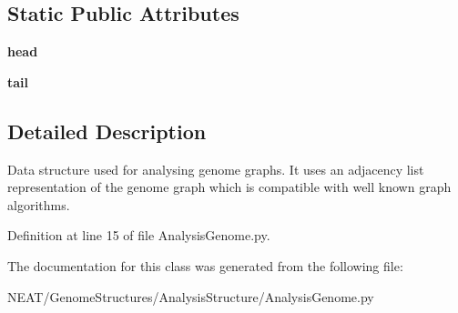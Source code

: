 \subsection*{Static Public Attributes}
\begin{DoxyCompactItemize}
\item 
{\bfseries head}\hypertarget{class_n_e_a_t___py_genetics_1_1_n_e_a_t_1_1_genome_structures_1_1_analysis_structure_1_1_analysis_genome_1_1_analysis_genome_a0738164ade43882c355f33037d133280}{}\label{class_n_e_a_t___py_genetics_1_1_n_e_a_t_1_1_genome_structures_1_1_analysis_structure_1_1_analysis_genome_1_1_analysis_genome_a0738164ade43882c355f33037d133280}

\item 
{\bfseries tail}\hypertarget{class_n_e_a_t___py_genetics_1_1_n_e_a_t_1_1_genome_structures_1_1_analysis_structure_1_1_analysis_genome_1_1_analysis_genome_a41704621b0d39e8476b95141dd1cf18d}{}\label{class_n_e_a_t___py_genetics_1_1_n_e_a_t_1_1_genome_structures_1_1_analysis_structure_1_1_analysis_genome_1_1_analysis_genome_a41704621b0d39e8476b95141dd1cf18d}

\end{DoxyCompactItemize}


\subsection{Detailed Description}
\begin{DoxyVerb}Data structure used for analysing genome graphs.
It uses an adjacency list representation of the genome graph
which is compatible with well known graph algorithms.
\end{DoxyVerb}
 

Definition at line 15 of file Analysis\+Genome.\+py.



The documentation for this class was generated from the following file\+:\begin{DoxyCompactItemize}
\item 
N\+E\+A\+T/\+Genome\+Structures/\+Analysis\+Structure/Analysis\+Genome.\+py\end{DoxyCompactItemize}
